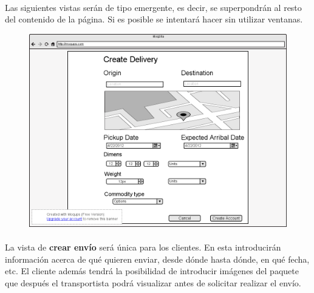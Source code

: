 \documentclass[10pt, a4paper,spanish]{article}
\begin{document}
			\paragraph{}
			Las siguientes vistas serán de tipo emergente, es decir, se superpondrán al resto del contenido de la página. Si es posible se intentará hacer sin utilizar ventanas.


			\begin{figure}[H]
				\centering
				\begin{minipage}[b]{0.7\textwidth}
					\includegraphics[width=\textwidth]{res/CrearEnvio.png}

				\end{minipage}
			\end{figure}

			\paragraph{}
			La vista de \textbf{crear envío} será única para los clientes. En esta introducirán información acerca de qué quieren enviar, desde dónde hasta dónde, en qué fecha, etc. El cliente además tendrá la posibilidad de introducir imágenes del paquete que después el transportista podrá visualizar antes de solicitar realizar el envío.
			
\end{document}

